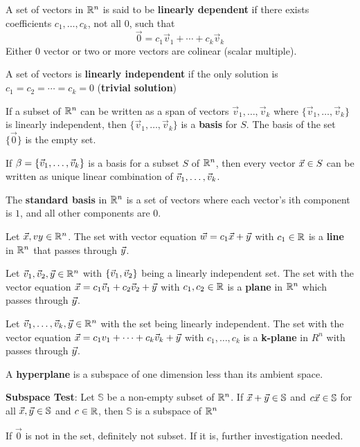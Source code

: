 \documentclass[english, 12pt]{article}
\begin{document}
\begin{defn}
A set of vectors in ${\mathbb{R}}^n$ is said to be \textbf{linearly dependent} if there exists coefficients $c_{1},\dots,c_{k}$, not all $0$, such that
\[\vec{0} = c_{1} \vec{v}_{1} + \cdots + c_{k} \vec{v}_{k}\]
Either $0$ vector or two or more vectors are colinear (scalar multiple).
\end{defn}
\begin{defn}
A set of vectors is \textbf{linearly independent} if the only solution is $c_{1} = c_{2} = \cdots = c_{k} = 0$ (\textbf{trivial solution})
\end{defn}

\begin{defn}
If a subset of ${\mathbb{R}}^n$ can be written as a span of vectors $\vec{v}_{1},\dots,\vec{v}_{k}$ where $\{\vec{v}_{1},\dots,\vec{v}_{k}\}$ is linearly independent, then $\{\vec{v}_{1},\dots,\vec{v}_{k}\}$ is a \textbf{basis} for $S$. The basis of the set $\{\vec{0}\}$ is the empty set.
\end{defn}

\begin{thrm}
If $\beta= \{\vec{v}_{1},\dots,\vec{v}_{k}\}$ is a basis for a subset $S$ of ${\mathbb{R}}^n$, then every vector $\vec{x} \in S$ can be written as unique linear combination of $\vec{v}_{1},\dots,\vec{v}_{k}$.
\end{thrm}
\begin{defn}
The \textbf{standard basis} in ${\mathbb{R}}^n$ is a set of vectors where each vector's ith component is $1$, and all other components are $0$.
\end{defn}
\begin{defn}
Let $\vec{x},vy \in {\mathbb{R}}^n$. The set with vector equation $\vec{w} = c_{1} \vec{x} + \vec{y}$ with $ c_{1} \in {\mathbb{R}}$ is a \textbf{line} in ${\mathbb{R}}^n$ that passes through $\vec{y}$.
\end{defn}
\begin{defn}
Let $\vec{v}_{1},\vec{v}_{2},\vec{y} \in {\mathbb{R}}^n$ with $\{\vec{v}_{1},\vec{v}_{2}\}$ being a linearly independent set. The set with the vector equation $\vec{x} = c_{1} \vec{v}_{1} + c_{2} \vec{v}_{2} + \vec{y}$ with $c_{1},c_{2} \in {\mathbb{R}}$ is a \textbf{plane} in ${\mathbb{R}}^n$ which passes through $\vec{y}$.
\end{defn}
\begin{defn}
Let $\vec{v}_{1},\dots,\vec{v}_{k},\vec{y} \in {\mathbb{R}}^n$ with the set being linearly independent. The set with the vector equation $\vec{x} = c_{1} v_{1} + \cdots + c_{k} \vec{v}_{k} + \vec{y}$ with $c_{1},\dots,c_{k}$ is a \textbf{k-plane} in $R^n$ with passes through $\vec{y}$.
\end{defn}
\begin{defn}
A \textbf{hyperplane} is a subspace of one dimension less than its ambient space.
\end{defn}


\begin{thrm}
\textbf{Subspace Test}: Let $\mathbb{S}$ be a non-empty subset of ${\mathbb{R}}^n$. If $\vec{x} + \vec{y} \in \mathbb{S}$ and $c \vec{x} \in \mathbb{S}$ for all $\vec{x},\vec{y} \in \mathbb{S}$ and $c \in {\mathbb{R}}$, then $\mathbb{S}$ is a subspace of ${\mathbb{R}}^n$
\end{thrm}
\begin{qte}
If $\vec{0}$ is not in the set, definitely not subset. If it is, further investigation needed.
\end{qte}
\end{document}
